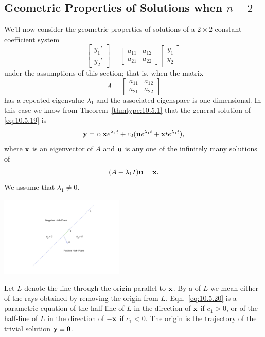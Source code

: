 \documentclass{ximera}
\begin{document}
\subsection*{Geometric Properties of Solutions when  $n=2$}
We'll now  consider the geometric properties of solutions of a
$2\times 2$ constant coefficient system
\begin{equation} \label{eq:10.5.19}
\begin{bmatrix}y_1'\\y_2'\end{bmatrix}=\begin{bmatrix}a_{11}&a_{12}\\a_{21}&a_{22}
\end{bmatrix}\begin{bmatrix}y_1\\y_2\end{bmatrix}
\end{equation}
under the assumptions of this section; that is, when the matrix
$$
A=\begin{bmatrix}a_{11}&a_{12}\\a_{21}&a_{22}
\end{bmatrix}
$$
has a repeated eigenvalue $\lambda_1$ and the associated eigenspace is
one-dimensional. In this case we know from Theorem~\ref{thmtype:10.5.1}
that the general solution of \eqref{eq:10.5.19} is
\begin{equation} \label{eq:10.5.20}
{\bf y}=c_1{\bf x}e^{\lambda_1t}+c_2({\bf u}e^{\lambda_1t}+{\bf
x}te^{\lambda_1t}),
\end{equation}
where ${\bf x}$ is an eigenvector of $A$ and ${\bf u}$ is any one of
the infinitely many solutions of
\begin{equation} \label{eq:10.5.21}
(A-\lambda_1I){\bf u}={\bf x}.
\end{equation}
We assume that $\lambda_1\neq0$.

\begin{image}
 \includegraphics[height=1.5in]{fig100501.jpg} 
\end{image}


Let $L$ denote the line through the origin parallel to ${\bf x}$. By a
 of $L$ we mean either of the rays obtained by
removing the origin from $L$. Eqn.~\eqref{eq:10.5.20} is a parametric
equation of the half-line of $L$ in the direction of ${\bf x}$ if
$c_1>0$, or of the half-line of $L$ in the direction of $-{\bf x}$ if
$c_1<0$. The origin is the trajectory of the trivial solution ${\bf
y}\equiv{\bf 0}$.
\end{document}
